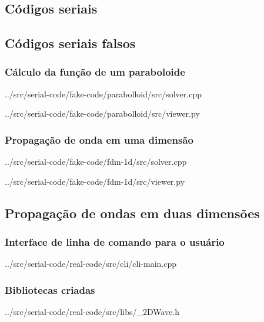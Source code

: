 \begin{appendices}
\chapter{Códigos seriais}
\section{Códigos seriais falsos}
	\subsection{Cálculo da função de um paraboloide}
	
	{../src/serial-code/fake-code/parabolloid/src/solver.cpp}
	
	
	{../src/serial-code/fake-code/parabolloid/src/viewer.py}
	
	\subsection{Propagação de onda em uma dimensão}
	
	{../src/serial-code/fake-code/fdm-1d/src/solver.cpp}
	
	
	{../src/serial-code/fake-code/fdm-1d/src/viewer.py}

\section{Propagação de ondas em duas dimensões}
	\subsection{Interface de linha de comando para o usuário}
	
	{../src/serial-code/real-code/src/cli/cli-main.cpp}

	\subsection{Bibliotecas criadas}
	
	{../src/serial-code/real-code/src/libs/_2DWave.h}
	

\end{appendices}
